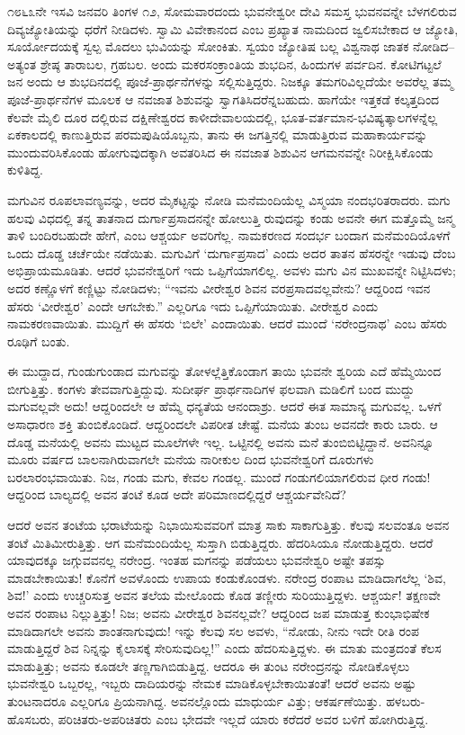 ೧೮೬೩ನೇ ಇಸವಿ ಜನವರಿ ತಿಂಗಳ ೧೨, ಸೋಮವಾರದಂದು ಭುವನೇಶ್ವರೀ ದೇವಿ ಸಮಸ್ತ ಭುವನವನ್ನೇ ಬೆಳಗಲಿರುವ ದಿವ್ಯಜ್ಯೋತಿಯನ್ನು ಧರೆಗೆ ನೀಡಿದಳು. ಸ್ವಾಮಿ ವಿವೇಕಾನಂದ ಎಂಬ ಪ್ರಖ್ಯಾತ ನಾಮದಿಂದ ಜ್ವಲಿಸಬೇಕಾದ ಆ ಜ್ಯೋತಿ, ಸೂರ್ಯೋದಯಕ್ಕೆ ಸ್ವಲ್ಪ ಮೊದಲು ಭುವಿಯನ್ನು ಸೋಂಕಿತು. ಸ್ವಯಂ ಜ್ಯೋತಿಷ ಬಲ್ಲ ವಿಶ್ವನಾಥ ಜಾತಕ ನೋಡಿದ–ಅತ್ಯಂತ ಶ್ರೇಷ್ಠ ತಾರಾಬಲ, ಗ್ರಹಬಲ. ಅಂದು ಮಕರಸಂಕ್ರಾಂತಿಯ ಶುಭದಿನ, ಹಿಂದುಗಳ ಪರ್ವದಿನ. ಕೋಟಿಗಟ್ಟಲೆ ಜನ ಅಂದು ಆ ಶುಭದಿನದಲ್ಲಿ ಪೂಜೆ-ಪ್ರಾರ್ಥನೆಗಳನ್ನು ಸಲ್ಲಿಸುತ್ತಿದ್ದರು. ನಿಜಕ್ಕೂ ತಮಗರಿವಿಲ್ಲದೆಯೇ ಅವರೆಲ್ಲ ತಮ್ಮ ಪೂಜೆ-ಪ್ರಾರ್ಥನೆಗಳ ಮೂಲಕ ಆ ನವಜಾತ ಶಿಶುವನ್ನು ಸ್ವಾಗತಿಸಿದರೆನ್ನಬಹುದು. ಹಾಗೆಯೇ ಇತ್ತಕಡೆ ಕಲ್ಕತ್ತದಿಂದ ಕೆಲವೇ ಮೈಲಿ ದೂರ ದಲ್ಲಿರುವ ದಕ್ಷಿಣೇಶ್ವರದ ಕಾಳೀದೇವಾಲಯದಲ್ಲಿ, ಭೂತ-ವರ್ತಮಾನ-ಭವಿಷ್ಯತ್ಕಾಲಗಳನ್ನೆಲ್ಲ ಏಕಕಾಲದಲ್ಲಿ ಕಾಣುತ್ತಿರುವ ಪರಮಪುಷಿಯೊಬ್ಬನು, ತಾನು ಈ ಜಗತ್ತಿನಲ್ಲಿ ಮಾಡುತ್ತಿರುವ ಮಹಾಕಾರ್ಯವನ್ನು ಮುಂದುವರಿಸಿಕೊಂಡು ಹೋಗುವುದಕ್ಕಾಗಿ ಅವತರಿಸಿದ ಈ ನವಜಾತ ಶಿಶುವಿನ ಆಗಮನವನ್ನೇ ನಿರೀಕ್ಷಿಸಿಕೊಂಡು ಕುಳಿತಿದ್ದ.

ಮಗುವಿನ ರೂಪಲಾವಣ್ಯವನ್ನು, ಅದರ ಮೈಕಟ್ಟನ್ನು ನೋಡಿ ಮನೆಮಂದಿಯೆಲ್ಲ ವಿಸ್ಮಯಾ ನಂದಭರಿತರಾದರು. ಮಗು ಹಲವು ವಿಧದಲ್ಲಿ ತನ್ನ ತಾತನಾದ ದುರ್ಗಾಪ್ರಸಾದನನ್ನೇ ಹೋಲುತ್ತಿ ರುವುದನ್ನು ಕಂಡು ಅವನೇ ಈಗ ಮತ್ತೊಮ್ಮೆ ಜನ್ಮ ತಾಳಿ ಬಂದಿರಬಹುದೇ ಹೇಗೆ, ಎಂಬ ಆಶ್ಚರ್ಯ ಅವರಿಗೆಲ್ಲ. ನಾಮಕರಣದ ಸಂದರ್ಭ ಬಂದಾಗ ಮನೆಮಂದಿಯೊಳಗೆ ಒಂದು ದೊಡ್ಡ ಚರ್ಚೆಯೇ ನಡೆಯಿತು. ಮಗುವಿಗೆ ‘ದುರ್ಗಾಪ್ರಸಾದ’ ಎಂದು ಅದರ ತಾತನ ಹೆಸರನ್ನೇ ಇಡುವು ದೆಂಬ ಅಭಿಪ್ರಾಯಮೂಡಿತು. ಆದರೆ ಭುವನೇಶ್ವರಿಗೆ ಇದು ಒಪ್ಪಿಗೆಯಾಗಲಿಲ್ಲ. ಅವಳು ಮಗು ವಿನ ಮುಖವನ್ನೇ ನಿಟ್ಟಿಸಿದಳು; ಅದರ ಕಣ್ಣೊಳಗೆ ಕಣ್ಣಿಟ್ಟು ನೋಡಿದಳು; “ಇವನು ವೀರೇಶ್ವರ ಶಿವನ ವರಪ್ರಸಾದವಲ್ಲವೇನು? ಆದ್ದರಿಂದ ಇವನ ಹೆಸರು ‘ವೀರೇಶ್ವರ’ ಎಂದೇ ಆಗಬೇಕು.” ಎಲ್ಲರಿಗೂ ಇದು ಒಪ್ಪಿಗೆಯಾಯಿತು. ವೀರೇಶ್ವರ ಎಂದು ನಾಮಕರಣವಾಯಿತು. ಮುದ್ದಿಗೆ ಈ ಹೆಸರು ‘ಬಿಲೇ’ ಎಂದಾಯಿತು. ಆದರೆ ಮುಂದೆ ‘ನರೇಂದ್ರನಾಥ’ ಎಂಬ ಹೆಸರು ರೂಢಿಗೆ ಬಂತು.

ಈ ಮುದ್ದಾದ, ಗುಂಡುಗುಂಡಾದ ಮಗುವನ್ನು ತೋಳಲ್ಲೆತ್ತಿಕೊಂಡಾಗ ತಾಯಿ ಭುವನೇ ಶ್ವರಿಯ ಎದೆ ಹೆಮ್ಮೆಯಿಂದ ಬೀಗುತ್ತಿತ್ತು. ಕಂಗಳು ತೇವವಾಗುತ್ತಿದ್ದುವು. ಸುದೀರ್ಘ ಪ್ರಾರ್ಥನಾದಿಗಳ ಫಲವಾಗಿ ಮಡಿಲಿಗೆ ಬಂದ ಮುದ್ದು ಮಗುವಲ್ಲವೇ ಅದು! ಆದ್ದರಿಂದಲೇ ಆ ಹೆಮ್ಮೆ ಧನ್ಯತೆಯ ಆನಂದಾಶ್ರು. ಆದರೆ ಈತ ಸಾಮಾನ್ಯ ಮಗುವಲ್ಲ. ಒಳಗೆ ಅಸಾಧಾರಣ ಶಕ್ತಿ ತುಂಬಿಕೊಂಡಿದೆ. ಆದ್ದರಿಂದಲೇ ವಿಪರೀತ ಚೇಷ್ಟೆ. ಮನೆಯ ತುಂಬ ಅವನದೇ ಕಾರು ಬಾರು. ಆ ದೊಡ್ಡ ಮನೆಯಲ್ಲಿ ಅವನು ಮುಟ್ಟದ ಮೂಲೆಗಳೇ ಇಲ್ಲ. ಒಟ್ಟಿನಲ್ಲಿ ಅವನು ಮನೆ ತುಂಬಿಬಿಟ್ಟಿದ್ದಾನೆ. ಅವನಿನ್ನೂ ಮೂರು ವರ್ಷದ ಬಾಲನಾಗಿರುವಾಗಲೇ ಮನೆಯ ನಾರೀಕುಲ ದಿಂದ ಭುವನೇಶ್ವರಿಗೆ ದೂರುಗಳು ಬರಲಾರಂಭವಾಯಿತು. ನಿಜ, ಗಂಡು ಮಗು, ಕೇವಲ ಗಂಡಲ್ಲ. ಮುಂದೆ ಗಂಡುಗಲಿಯಾಗಲಿರುವ ಧೀರ ಗಂಡು! ಆದ್ದರಿಂದ ಬಾಲ್ಯದಲ್ಲಿ ಅವನ ತಂಟೆ ಕೂಡ ಅದೇ ಪರಿಮಾಣದಲ್ಲಿದ್ದರೆ ಆಶ್ಚರ್ಯವೇನಿದೆ?

ಆದರೆ ಅವನ ತಂಟೆಯ ಭರಾಟೆಯನ್ನು ನಿಭಾಯಿಸುವವರಿಗೆ ಮಾತ್ರ ಸಾಕು ಸಾಕಾಗುತ್ತಿತ್ತು. ಕೆಲವು ಸಲವಂತೂ ಅವನ ತಂಟೆ ಮಿತಿಮೀರುತ್ತಿತ್ತು. ಆಗ ಮನೆಮಂದಿಯೆಲ್ಲ ಸುಸ್ತಾಗಿ ಬಿಡುತ್ತಿದ್ದರು. ಹೆದರಿಸಿಯೂ ನೋಡುತ್ತಿದ್ದರು. ಆದರೆ ಯಾವುದಕ್ಕೂ ಜಗ್ಗುವವನಲ್ಲ ನರೇಂದ್ರ. ಇಂತಹ ಮಗನನ್ನು ಪಡೆಯಲು ಭುವನೇಶ್ವರಿ ಅಷ್ಟೇ ತಪಸ್ಸು ಮಾಡಬೇಕಾಯಿತು! ಕೊನೆಗೆ ಅವಳೊಂದು ಉಪಾಯ ಕಂಡುಕೊಂಡಳು. ನರೇಂದ್ರ ರಂಪಾಟ ಮಾಡಿದಾಗಲೆಲ್ಲ ‘ಶಿವ, ಶಿವ!’ ಎಂದು ಉಚ್ಚರಿಸುತ್ತ ಅವನ ತಲೆಯ ಮೇಲೊಂದು ಕೊಡ ತಣ್ಣೀರು ಸುರಿಯುತ್ತಿದ್ದಳು. ಆಶ್ಚರ್ಯ! ತಕ್ಷಣವೇ ಅವನ ರಂಪಾಟ ನಿಲ್ಲುತ್ತಿತ್ತು! ನಿಜ; ಅವನು ವೀರೇಶ್ವರ ಶಿವನಲ್ಲವೇ? ಆದ್ದರಿಂದ ಜಪ ಮಾಡುತ್ತ ಕುಂಭಾಭಿಷೇಕ ಮಾಡಿದಾಗಲೇ ಅವನು ಶಾಂತನಾಗುವುದು! ಇನ್ನು ಕೆಲವು ಸಲ ಅವಳು, “ನೋಡು, ನೀನು ಇದೇ ರೀತಿ ರಂಪ ಮಾಡುತ್ತಿದ್ದರೆ ಶಿವ ನಿನ್ನನ್ನು ಕೈಲಾಸಕ್ಕೆ ಸೇರಿಸುವುದಿಲ್ಲ!” ಎಂದು ಹೆದರಿಸುತ್ತಿದ್ದಳು. ಈ ಮಾತು ಮಂತ್ರದಂತೆ ಕೆಲಸ ಮಾಡುತ್ತಿತ್ತು; ಅವನು ಕೂಡಲೇ ತಣ್ಣಗಾಗಿಬಿಡುತ್ತಿದ್ದ. ಆದರೂ ಈ ತುಂಟ ನರೇಂದ್ರನನ್ನು ನೋಡಿಕೊಳ್ಳಲು ಭುವನೇಶ್ವರಿ ಒಬ್ಬರಲ್ಲ, ಇಬ್ಬರು ದಾದಿಯರನ್ನು ನೇಮಕ ಮಾಡಿಕೊಳ್ಳಬೇಕಾಯಿತಂತೆ! ಆದರೆ ಅವನು ಅಷ್ಟು ತುಂಟನಾದರೂ ಎಲ್ಲರಿಗೂ ಪ್ರಿಯನಾಗಿದ್ದ. ಅವನಲ್ಲೊಂದು ಮಾಧುರ್ಯ ವಿತ್ತು; ಆಕರ್ಷಣೆಯಿತ್ತು. ಹಳಬರು-ಹೊಸಬರು, ಪರಿಚಿತರು-ಅಪರಿಚಿತರು ಎಂಬ ಭೇದವೇ ಇಲ್ಲದೆ ಯಾರು ಕರೆದರೆ ಅವರ ಬಳಿಗೆ ಹೋಗಿರುತ್ತಿದ್ದ.

